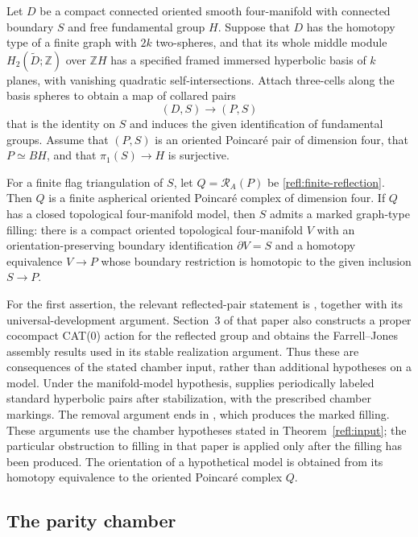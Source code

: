 \begin{theorem}
\label{refl:input}
Let $D$ be a compact connected oriented smooth four-manifold with
connected boundary $S$ and free fundamental group $H$.  Suppose that
$D$ has the homotopy type of a finite graph with $2k$ two-spheres,
and that its whole middle module $H_2(\widetilde D;\mathbb Z)$ over
$\mathbb ZH$ has a specified
framed immersed hyperbolic basis of $k$ planes, with vanishing
quadratic self-intersections.  Attach three-cells along the basis
spheres to obtain a map of collared pairs
\[
 (D,S)\longrightarrow(P,S)
\]
that is the identity on $S$ and induces the given identification of
fundamental groups.  Assume that $(P,S)$ is an oriented Poincar\'e
pair of dimension four, that $P\simeq BH$, and that
$\pi_1(S)\to H$ is surjective.

For a finite flag triangulation of $S$, let
$Q=\mathcal R_A(P)$ be \eqref{refl:finite-reflection}.  Then $Q$ is a
finite aspherical oriented Poincar\'e complex of dimension four.
If $Q$ has a closed topological four-manifold model, then $S$ admits
a marked graph-type filling: there is a compact oriented topological
four-manifold $V$ with an orientation-preserving boundary identification
$\partial V=S$ and a homotopy
equivalence $V\to P$ whose boundary restriction is homotopic to the
given inclusion $S\to P$.
\end{theorem}

For the first assertion, the relevant reflected-pair statement is
\cite[Proposition~3.2]{PD}, together with its universal-development
argument.  Section~3 of that paper also constructs a proper cocompact
CAT(0) action for the reflected group and obtains the Farrell--Jones
assembly results used in its stable realization argument.  Thus these
are consequences of the stated chamber input, rather than additional
hypotheses on a model.  Under the manifold-model hypothesis,
\cite[Proposition~4.6]{PD} supplies periodically labeled standard
hyperbolic pairs after stabilization, with the prescribed chamber
markings.  The removal argument ends in
\cite[Proposition~5.5]{PD}, which produces the marked filling.  These
arguments use the chamber hypotheses stated in
Theorem~\ref{refl:input}; the particular obstruction to filling in
that paper is applied only after the filling has been produced.
The orientation of a hypothetical model is obtained from its
homotopy equivalence to the oriented Poincar\'e complex $Q$.

\subsection{The parity chamber}

